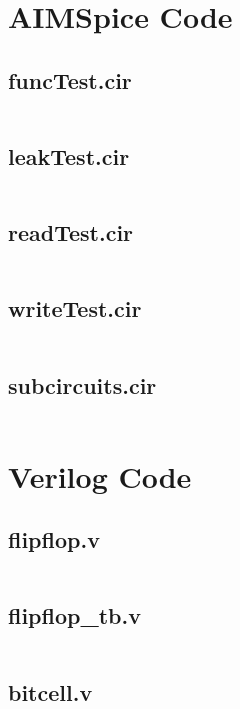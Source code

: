 \section*{AIMSpice Code}

\subsection*{funcTest.cir}
\inputminted{text}{../aimSpice/funcTest.cir}

\subsection*{leakTest.cir}
\inputminted{text}{../aimSpice/leakTest.cir}

\subsection*{readTest.cir}
\inputminted{text}{../aimSpice/readTest.cir}

\subsection*{writeTest.cir}
\inputminted{text}{../aimSpice/writeTest.cir}

\subsection*{subcircuits.cir}
\inputminted{text}{../aimSpice/subcircuits.cir}

\section*{Verilog Code}

\subsection*{flipflop.v}
\inputminted{verilog}{../verilog_mem8x8_m_tri_state_buffer/flipflop.v}

\subsection*{flipflop\_tb.v}
\inputminted{verilog}{../verilog_mem8x8_m_tri_state_buffer/flipflop_tb.v}

\subsection*{bitcell.v}
\inputminted{verilog}{../verilog_mem8x8_m_tri_state_buffer/bitcell.v}


